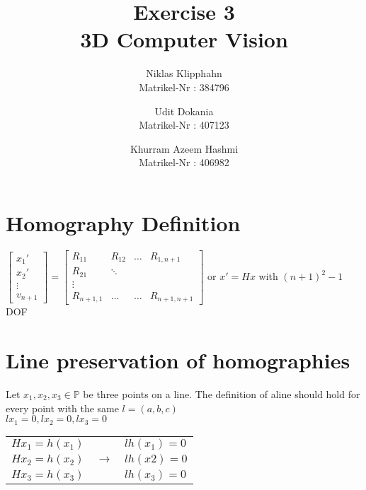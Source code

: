 \documentclass[a4paper, twoside, english]{article}
\title{Exercise 3 \\ 3D Computer Vision}  %
\author{Niklas Klipphahn \\ Matrikel-Nr : 384796
\and
Udit Dokania \\ Matrikel-Nr : 407123
\and
Khurram Azeem Hashmi \\ Matrikel-Nr : 406982
}                       %
\begin{document}
	
\maketitle

\section{Homography Definition}
$
\begin{bmatrix}
	x_1'\\
	x_2'\\
	\vdots\\
	v_{n+1}
\end{bmatrix}
= 
\begin{bmatrix}
	R_{11} & R_{12} & \dots & R_{1,n+1}\\
	R_{21} & \ddots \\
	\vdots \\
	R_{n+1,1} & \dots & \dots & R_{n+1,n+1}
\end{bmatrix}
$
or $x' = Hx$ with $(n+1)^2 -1$ DOF

\section{Line preservation of homographies}

Let $x_1,x_2,x_3 \in \mathbb{P}$ be three points on a line.
The definition of aline should hold for every point with the same $l=(a,b,c)$\\
$l x_1 = 0, l x_2 = 0, l x_3 = 0$\\

\begin{tabular}{lll}
$H x_1 = h(x_1)$ & &$ l h(x_1)=0$\\
$H x_2 = h(x_2)$ & $\rightarrow$ & $l h(x2) = 0$\\
$H x_3 = h(x_3)$ & & $l h(x_3) = 0$	
\end{tabular}
\end{document}
